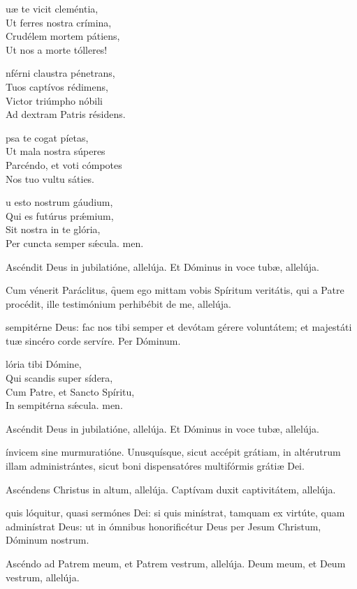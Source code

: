 \documentclass[fontsize=9pt,paper=A6,twoside,BCOR=1mm,DIV=22,headinclude]{scrarticle}
\begin{document}
\begin{multicols}{2}
\begin{hymnus}
uæ te vicit cleméntia,\\
Ut ferres nostra crímina,\\
Crudélem mortem pátiens,\\
Ut nos a morte tólleres!

nférni claustra pénetrans,\\
Tuos captívos rédimens,\\
Victor triúmpho nóbili\\
Ad dextram Patris résidens.

psa te cogat píetas,\\
Ut mala nostra súperes\\
Parcéndo, et voti cómpotes\\
Nos tuo vultu sáties.

u esto nostrum gáudium,\\
Qui es futúrus prǽmium,\\
Sit nostra in te glória,\\
Per cuncta semper sǽcula.
men.
\end{hymnus}

\V Ascéndit Deus in jubilatióne, allelúja.
\R Et Dóminus in voce tubæ, allelúja.

\B Cum vénerit Paráclitus, \f quem ego mittam vobis Spíritum veritátis, qui a Patre procédit, ille testimónium perhibébit de me, allelúja.

 sempitérne Deus: fac nos tibi semper et devótam gérere voluntátem; et majestáti tuæ sincéro corde servíre. Per Dóminum.


\begin{hymnus}
	lória tibi Dómine,\\
Qui scandis super sídera,\\
Cum Patre, et Sancto Spíritu,\\
In sempitérna sǽcula.
men.
\end{hymnus}



\V Ascéndit Deus in jubilatióne, allelúja.
\R Et Dóminus in voce tubæ, allelúja.

 ínvicem sine murmuratióne. Unusquísque, sicut accépit grátiam, in altérutrum illam administrántes, sicut boni dispensatóres multifórmis grátiæ Dei.

\V Ascéndens Christus in altum, allelúja.
\R Captívam duxit captivitátem, allelúja.

 quis lóquitur, quasi sermónes Dei: si quis minístrat, tamquam ex virtúte, quam adminístrat Deus: ut in ómnibus honorificétur Deus per Jesum Christum, Dóminum nostrum.

\V Ascéndo ad Patrem meum, et Patrem vestrum, allelúja.
\R Deum meum, et Deum vestrum, allelúja.

\end{multicols}
\end{document}
